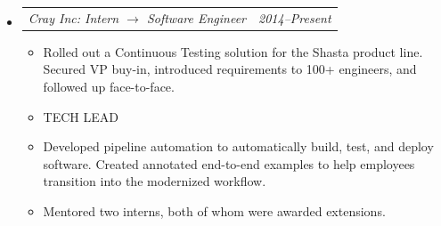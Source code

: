 \documentclass[12pt,letterpaper]{article}
\makeatletter
\newcommand{\headerpair}[2]{
    \begin{tabular*}{\linewidth}{l@{ \extracolsep{\fill} }r} {\large\emph{#1}} & {\large\emph{#2}}
    \end{tabular*}
}
\newcommand{\headerrow}[3]{\headerpair{#2: #1}{#3}}
\makeatother
\begin{document}
\begin{itemize}[leftmargin=\parindent]
    \parskip=0.1em
    \itemsep=1.2em
    \item[]
        \headerrow
            {Intern $\to$ Software Engineer}
            {Cray Inc}
            {2014--Present}
        \begin{itemize}[leftmargin=\parindent]
            \itemsep=0.3em

            \item Rolled out a Continuous Testing solution for the Shasta product line. Secured VP buy-in, introduced requirements to 100+ engineers, and followed up face-to-face.

            \item TECH LEAD




            \item Developed pipeline automation to automatically build, test, and deploy software. Created annotated end-to-end examples to help employees transition into the modernized workflow.

            \item Mentored two interns, both of whom were awarded extensions.





\end{itemize}
\end{itemize}
\end{document}
